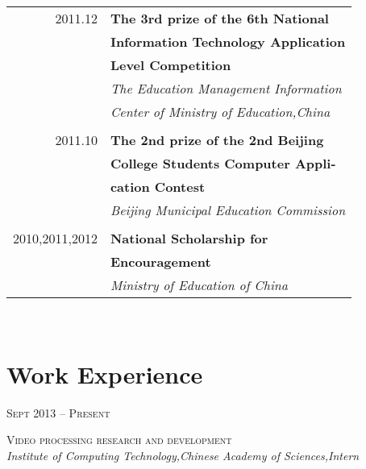 \documentclass[10pt,a4paper]{article} %
\begin{document}
\begin{minipage}[t]{0.44\textwidth}
\begin{tabular}{rl}
2011.12     & \small\textbf{The 3rd prize of the 6th National} \\
& \small\textbf{ Information Technology Application }\\
& \small\textbf{ Level Competition}\\
& \small\textit{The Education Management Information}\\
& \small\textit{ Center of Ministry of Education,China}\\ \\

2011.10     & \small\textbf{The 2nd prize of the 2nd Beijing}\\
& \small\textbf{ College Students Computer Appli-}\\
& \small\textbf{ cation Contest}\\
& \small\textit{Beijing Municipal Education Commission}\\ \\

2010,2011,2012    & \small\textbf{National Scholarship for }\\
& \small\textbf{ Encouragement}\\
& \small\textit{Ministry of Education of China}

\end{tabular}\\[0pt]


\section{Work Experience}
{\raggedleft\textsc{Sept 2013 -- Present}\par}

{\raggedright \small\textsc{Video processing research and development }\\

\textit{ Institute of Computing Technology,Chinese Academy of Sciences,Intern}\\}


\end{minipage}
\end{document}
